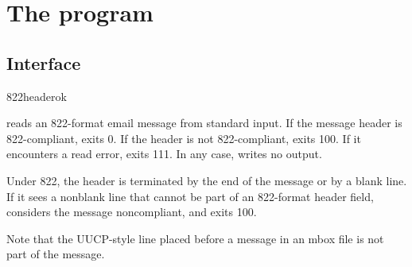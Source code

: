 
\chapter{The  program}

\section{Interface}
\begin{code}
  822headerok
\end{code}

 reads an 822-format email message from standard
input.  If the message header is 822-compliant, 
exits 0.  If the header is not 822-compliant,  exits
100.  If it encounters a read error,  exits 111.  In
any case,  writes no output.

Under 822, the header is terminated by the end of the message or by a
blank line.  If it sees a nonblank line that cannot be part of an
822-format header field,  considers the message
noncompliant, and exits 100.

Note that the UUCP-style  line placed before a message
in an mbox file is not part of the message.

